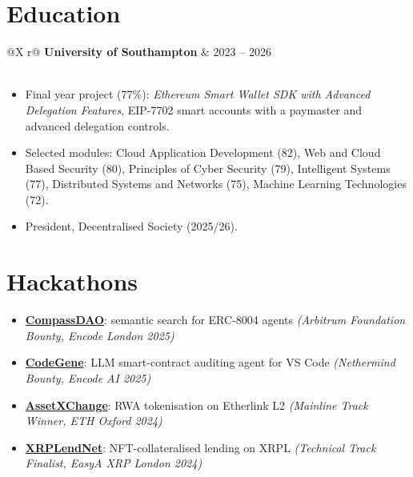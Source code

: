 \documentclass[a4paper,11pt]{article}
\newcommand{\ERC}{\mbox{ERC-8004}}
\begin{document}
\section{Education}
\begin{tabularx}{\linewidth}{@{}X r@{}}
\textbf{University of Southampton} & 2023 -- 2026 \\[1pt]
 \\
\end{tabularx}
\vspace{-11pt}
\begin{itemize}[nosep, leftmargin=1em, itemsep=1.5pt]
    \item[--] Final year project (77\%): \textit{Ethereum Smart Wallet SDK with Advanced Delegation Features}, EIP-7702 smart accounts with a paymaster and advanced delegation controls.
    \item[--] Selected modules: Cloud Application Development (82), Web and Cloud Based Security (80), Principles of Cyber Security (79), Intelligent Systems (77), Distributed Systems and Networks (75), Machine Learning Technologies (72).
    \item[--] President, Decentralised Society (2025/26).
\end{itemize}


\section{Hackathons}

\begin{itemize}[nosep, leftmargin=1em, itemsep=1.5pt]
    \item[--] \textbf{\href{https://github.com/ojasarora77/compass-dao}{CompassDAO}}: semantic search for \ERC{} agents \textit{(Arbitrum Foundation Bounty, Encode London 2025)}
    \item[--] \textbf{\href{https://github.com/dawe000/codegene}{CodeGene}}: LLM smart-contract auditing agent for VS Code \textit{(Nethermind Bounty, Encode AI 2025)}
    \item[--] \textbf{\href{https://github.com/ojasarora77/AssetXchange}{AssetXChange}}: RWA tokenisation on Etherlink L2 \textit{(Mainline Track Winner, ETH Oxford 2024)}
    \item[--] \textbf{\href{https://github.com/DanyloPiatyhorets/XRPLendNet}{XRPLendNet}}: NFT-collateralised lending on XRPL \textit{(Technical Track Finalist, EasyA XRP London 2024)}
\end{itemize}
\end{document}
